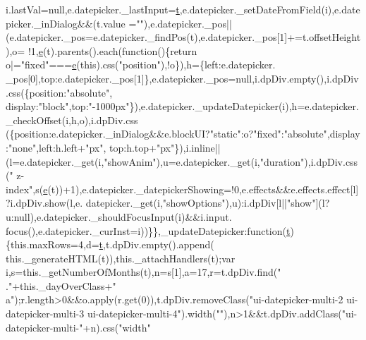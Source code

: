 \begin{DoxyCode}
      i.lastVal=null,e.datepicker.\_lastInput=\hyperlink{jquery-2_80_83_8min_8js_aaccc9105df5383111407fd5b41255e23}{t},e.datepicker.\_setDateFromField(i),e.datepicker.\_inDialog&&(t.value
      =\textcolor{stringliteral}{""}),e.datepicker.\_pos||(e.datepicker.\_pos=e.datepicker.\_findPos(t),e.datepicker.\_pos[1]+=t.offsetHeight),o=
      !1,\hyperlink{jquery-ui_8min_8js_a2c038346d47955cbe2cb91e338edd7e1}{e}(t).parents().each(\textcolor{keyword}{function}()\{\textcolor{keywordflow}{return} o|=\textcolor{stringliteral}{"fixed"}===\hyperlink{jquery-ui_8min_8js_a2c038346d47955cbe2cb91e338edd7e1}{e}(\textcolor{keyword}{this}).css(\textcolor{stringliteral}{"position"}),!o\}),h=\{left:e.datepicker.
      \_pos[0],top:e.datepicker.\_pos[1]\},e.datepicker.\_pos=null,i.dpDiv.empty(),i.dpDiv.css(\{position:\textcolor{stringliteral}{"absolute"},
      display:\textcolor{stringliteral}{"block"},top:\textcolor{stringliteral}{"-1000px"}\}),e.datepicker.\_updateDatepicker(i),h=e.datepicker.\_checkOffset(i,h,o),i.dpDiv.css
      (\{position:e.datepicker.\_inDialog&&e.blockUI?\textcolor{stringliteral}{"static"}:o?\textcolor{stringliteral}{"fixed"}:\textcolor{stringliteral}{"absolute"},display:\textcolor{stringliteral}{"none"},left:h.left+\textcolor{stringliteral}{"px"},
      top:h.top+\textcolor{stringliteral}{"px"}\}),i.inline||(l=e.datepicker.\_get(i,\textcolor{stringliteral}{"showAnim"}),u=e.datepicker.\_get(i,\textcolor{stringliteral}{"duration"}),i.dpDiv.css(\textcolor{stringliteral}{"
      z-index"},s(\hyperlink{jquery-ui_8min_8js_a2c038346d47955cbe2cb91e338edd7e1}{e}(t))+1),e.datepicker.\_datepickerShowing=!0,e.effects&&e.effects.effect[l]?i.dpDiv.show(l,e.
      datepicker.\_get(i,\textcolor{stringliteral}{"showOptions"}),u):i.dpDiv[l||\textcolor{stringliteral}{"show"}](l?u:null),e.datepicker.\_shouldFocusInput(i)&&i.input.
      focus(),e.datepicker.\_curInst=i))\}\},\_updateDatepicker:\textcolor{keyword}{function}(\hyperlink{jquery-2_80_83_8min_8js_aaccc9105df5383111407fd5b41255e23}{t})\{this.maxRows=4,d=\hyperlink{jquery-2_80_83_8min_8js_aaccc9105df5383111407fd5b41255e23}{t},t.dpDiv.empty().append(
      this.\_generateHTML(t)),this.\_attachHandlers(t);var i,s=this.\_getNumberOfMonths(t),n=s[1],a=17,r=t.dpDiv.find(\textcolor{stringliteral}{"
      ."}+this.\_dayOverClass+\textcolor{stringliteral}{" a"});r.length>0&&o.apply(r.get(0)),t.dpDiv.removeClass(\textcolor{stringliteral}{"ui-datepicker-multi-2
       ui-datepicker-multi-3 ui-datepicker-multi-4"}).width(\textcolor{stringliteral}{""}),n>1&&t.dpDiv.addClass(\textcolor{stringliteral}{"ui-datepicker-multi-"}+n).css(\textcolor{stringliteral}{"width"}

\end{DoxyCode}
